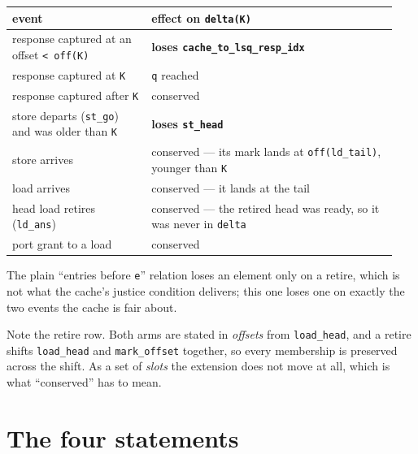 \documentclass[11pt]{article}
\begin{document}
{\small
\begin{tabular}{@{} L{0.34\linewidth} L{0.60\linewidth} @{}}
\toprule
event & effect on \texttt{delta(K)} \\
\midrule
response captured at an offset \texttt{< off(K)} & \textbf{loses \texttt{cache_to_lsq_resp_idx}} \\
response captured at \texttt{K} & \texttt{q} reached \\
response captured after \texttt{K} & conserved \\
store departs (\texttt{st_go}) and was older than \texttt{K} & \textbf{loses \texttt{st_head}} \\
store arrives & conserved --- its mark lands at \texttt{off(ld_tail)}, younger than \texttt{K} \\
load arrives & conserved --- it lands at the tail \\
head load retires (\texttt{ld_ans}) & conserved --- the retired head was ready, so it was never in \texttt{delta} \\
port grant to a load & conserved \\
\bottomrule
\end{tabular}
\par}

The plain ``entries before \texttt{e}'' relation loses an element only on
a retire, which is not what the cache's justice condition delivers; this
one loses one on exactly the two events the cache is fair about.

Note the retire row. Both arms are stated in \emph{offsets} from
\texttt{load_head}, and a retire shifts \texttt{load_head} and
\texttt{mark_offset} together, so every membership is
preserved across the shift. As a set of \emph{slots} the extension does
not move at all, which is what ``conserved'' has to mean.

\section{The four statements}
\end{document}
